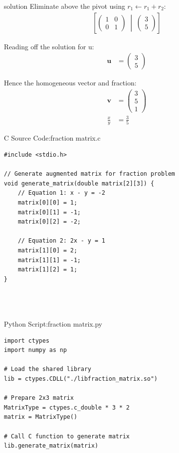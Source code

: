 \documentclass{beamer}
\numberwithin{equation}{section}
\theoremstyle{remark}
\newcommand{\myvec}[1]{\ensuremath{\begin{pmatrix}#1\end{pmatrix}}}
\let\vec\mathbf
\begin{document}
\begin{frame}{solution}
Eliminate above the pivot using 
\(r_1 \leftarrow r_1 + r_2\):
\begin{align}
\left[\myvec{1 & 0 \\ 0 & 1} \;\middle|\; \myvec{3 \\ 5}\right]
\end{align}



Reading off the solution for u:
\begin{align}
\vec{u} &= \myvec{3 \\ 5}
\end{align}

Hence the homogeneous vector and fraction:
\begin{align}
\vec{v} &= \myvec{3 \\ 5 \\ 1} \\
\frac{x}{y} &= \frac{3}{5}
\end{align}
\end{frame}
\begin{frame}[fragile]{C Source Code:fraction matrix.c}
\begin{verbatim}
#include <stdio.h>

// Generate augmented matrix for fraction problem
void generate_matrix(double matrix[2][3]) {
    // Equation 1: x - y = -2
    matrix[0][0] = 1;
    matrix[0][1] = -1;
    matrix[0][2] = -2;

    // Equation 2: 2x - y = 1
    matrix[1][0] = 2;
    matrix[1][1] = -1;
    matrix[1][2] = 1;
}




\end{verbatim}
\end{frame}

\begin{frame}[fragile]{Python Script:fraction matrix.py}
\begin{verbatim}
import ctypes
import numpy as np

# Load the shared library
lib = ctypes.CDLL("./libfraction_matrix.so")

# Prepare 2x3 matrix
MatrixType = ctypes.c_double * 3 * 2
matrix = MatrixType()

# Call C function to generate matrix
lib.generate_matrix(matrix)



\end{verbatim}
\end{frame}
\end{document}
